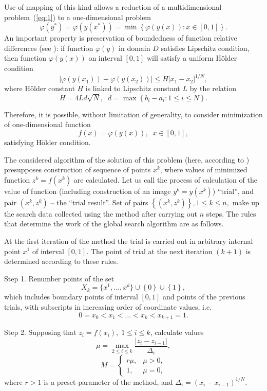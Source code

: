 \documentclass[smallcondensed]{svjour3}     %
\begin{document}
Use of mapping of this kind allows a reduction of a multidimensional problem~(\ref{eq:1}) to a one-dimensional problem
\[
\varphi(y^\ast)=\varphi(y(x^\ast))=\min{\left\{\varphi(y(x)): x\in[0,1]\right\}}.
\]
An important property is preservation of boundedness of function relative differences  (see \cite{RefStrongin2000}): if function $\varphi(y)$ in domain $D$ satisfies Lipschitz condition, then function $\varphi(y(x))$ on interval $[0,1]$ will satisfy a uniform H{\"o}lder condition
\[
\left|\varphi(y(x_1))-\varphi(y(x_2))\right|\leq H\left|x_1-x_2\right|^{1/N},
\]
where H{\"o}lder constant $H$ is linked to Lipschitz constant $L$ by the relation
\[
H=4Ld\sqrt{N},\;\; d=\max{\left\{b_i-a_i:1\leq i \leq N\right\}}.
\]

Therefore, it is possible, without limitation of generality, to consider minimization of one-dimensional function
\[
f(x)=\varphi(y(x)), \;\; x\in[0,1],
\]
satisfying H{\"o}lder condition.

The considered algorithm of the solution of this problem (here, according to \cite{RefStrongin2000}) presupposes construction of sequence of points $x^k$, where values of minimized function $z^k = f(x^k)$ are calculated. Let us call the process of calculation of the value of function (including construction of an image $y^k=y(x^k)$) ``trial'', and pair $(x^k, z^k)$ --  the ``trial result''. Set of pairs $\left\{(x^k, z^k)\right\}, 1\leq k\leq n,$ make up the search data collected using the method after carrying out $n$ steps. The rules that determine the work of the global search algorithm are as follows.

At the first iteration of the method the trial is carried out in arbitrary internal point $x^1$ of interval $[0,1]$. The point of trial at the next iteration $(k+1)$ is determined according to these rules.

Step 1. Renumber points of the set
\[
X_k=\{x^1,\dots,x^k\}\cup\left\{0\right\}\cup\left\{1\right\},
\]
which includes boundary points of interval $[0,1]$ and points of the previous trials, with subscripts in increasing order of coordinate values, i.e.
\[
0=x_0<x_1<\dots <x_k<x_{k+1}=1.
\]

Step 2. Supposing that  $z_i=f(x_i), \; 1\leq i \leq k$, calculate values 
\begin{equation}\label{eq:11}
\mu = \max_{2\leq i \leq k}\frac{\left|z_i-z_{i-1}\right|}{\Delta_i},
\end{equation}
\[
M = \left\{
   \begin{array}{lr}
     r\mu, & \mu > 0,\\
     1, & \mu = 0,
   \end{array}
\right.
 \]
where $r>1$ is a preset parameter of the method, and $\Delta_i=\left(x_i-x_{i-1}\right)^{1/N}$.
\end{document}
